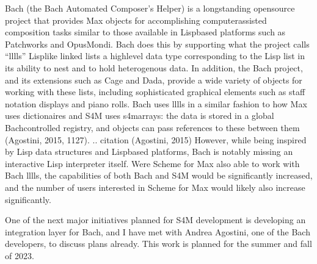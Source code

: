 \documentclass[letterpaper,10pt,english]{sphinxmanual}
\begin{document}
\sphinxAtStartPar
Bach (the Bach Automated Composer’s Helper) is a long\sphinxhyphen{}standing open\sphinxhyphen{}source
project that provides Max objects for accomplishing computer\sphinxhyphen{}assisted composition
tasks similar to those available in Lisp\sphinxhyphen{}based platforms such as Patchworks and OpusMondi.
Bach does this by supporting what the project calls “lllls” \textendash{} Lisp\sphinxhyphen{}like linked lists \textendash{} a high\sphinxhyphen{}level
data type corresponding to the Lisp list in its ability to nest and to hold heterogenous data.
In addition, the Bach project, and its extensions such as Cage and Dada, provide
a wide variety of objects for working with these lists, including sophisticated graphical
elements such as staff notation displays and piano rolls.
Bach uses lllls in a similar fashion to how Max uses dictionaires
and S4M uses s4m\sphinxhyphen{}arrays: the data is stored in a global Bach\sphinxhyphen{}controlled registry,
and objects can pass references to these between them (Agostini, 2015, 11\sphinxhyphen{}27).
.. citation (Agostini, 2015)
However, while being inspired by Lisp data structures and Lisp\sphinxhyphen{}based platforms,
Bach is notably missing an interactive Lisp interpreter itself.
Were Scheme for Max also able to work with Bach lllls, the capabilities of both Bach
and S4M would be significantly increased, and the number of users interested in Scheme
for Max would likely also increase significantly.

\sphinxAtStartPar
One of the next major initiatives planned for S4M development is
developing an integration layer for Bach, and I have met with Andrea Agostini, one
of the Bach developers, to discuss plans already. This work is planned for the summer and fall of 2023.
\end{document}
